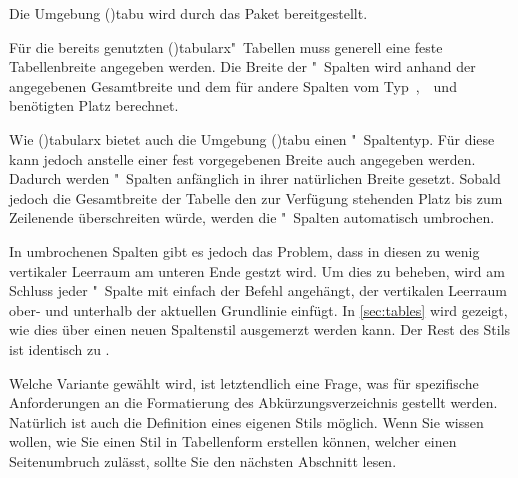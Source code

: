 \documentclass[%
  english,ngerman,%
  cdgeometry=no,DIV=12,%
  cd=false,cdfont=false,cdtitle=true,%
  headings=normal,%
  automark,%
  listof=toc,%
]{tudscrartcl}
\begin{document}

Die Umgebung \Environment(){tabu} wird durch das Paket 
 bereitgestellt. 

Für die bereits genutzten \Environment(){tabularx}"~Tabellen 
muss generell eine feste Tabellenbreite angegeben werden. Die Breite der 
"~Spalten wird anhand der angegebenen Gesamtbreite und dem für andere 
Spalten vom Typ~,~~und~ benötigten Platz 
berechnet. 

Wie \Environment(){tabularx} bietet auch die Umgebung 
\Environment(){tabu} einen "~Spaltentyp. Für diese kann 
jedoch anstelle einer fest vorgegebenen Breite auch  
angegeben werden. Dadurch werden "~Spalten anfänglich in ihrer 
natürlichen Breite gesetzt. Sobald jedoch die Gesamtbreite der Tabelle den zur 
Verfügung stehenden Platz bis zum Zeilenende überschreiten würde, werden die 
"~Spalten automatisch umbrochen. 

In umbrochenen Spalten gibt es jedoch das Problem, dass in diesen zu wenig 
vertikaler Leerraum am unteren Ende gestzt wird. Um dies zu beheben, wird am 
Schluss jeder "~Spalte mit  
einfach der Befehl  angehängt, der vertikalen Leerraum ober- und 
unterhalb der aktuellen Grundlinie einfügt. In \autoref{sec:tables} wird 
gezeigt, wie dies über einen neuen Spaltenstil ausgemerzt werden kann. Der Rest 
des Stils ist identisch zu .
%
\CodeHook{\let\newglossarystyle\renewglossarystyle}
\begin{Preamble*}

\end{Preamble*}
\begin{Hint}
\printacronyms[style=acrotabu]
\end{Hint}
\begin{quoting}[rightmargin=0pt]
\glsdisablehyper
\InputCode
\end{quoting}
%
Welche Variante gewählt wird, ist letztendlich eine Frage, was für spezifische 
Anforderungen an die Formatierung des Abkürzungsverzeichnis gestellt werden. 
Natürlich ist auch die Definition eines eigenen Stils möglich. Wenn Sie wissen 
wollen, wie Sie einen Stil in Tabellenform erstellen können, welcher einen 
Seitenumbruch zulässt, sollte Sie den nächsten Abschnitt lesen.
\end{document}
